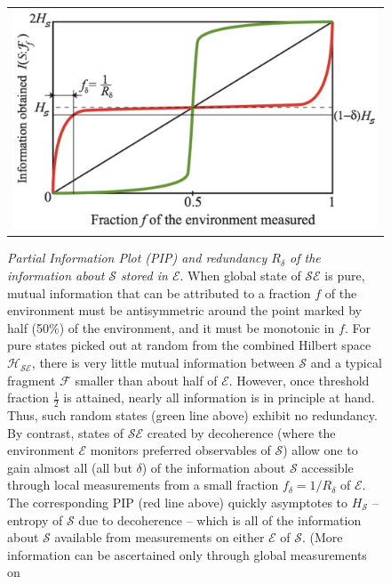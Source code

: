 \documentclass[aps,twocolumn,rmp,epsfig]{revtex4}
\def\FCW{0.98\columnwidth}
\newcommand{\cH}        {{\mathcal H}}
\newcommand{\cS}        {{\mathcal S}}
\newcommand{\cE}        {{\mathcal E}}
\newcommand{\+}         {\dagger}
\newcommand\cF{{\mathcal F}}
\begin{document}
\begin{figure}[tb]
\begin{tabular}{l}
\vspace{-0.15in} \includegraphics[width=\FCW]{pips1B.pdf}\\
\end{tabular}
\caption{\emph{Partial Information Plot (PIP) and redundancy $R_\delta$ of the information 
about $\cS$ stored in $\cE$}.  When global state of $\cS\cE$ is pure, mutual information that can be 
attributed to a fraction $f$ of the environment must be antisymmetric around the point marked by half 
(50\%) of the environment, and it must be monotonic in $f$. For pure states picked out at random from 
the combined Hilbert space $\cH_{\cS\cE}$, there is very little mutual information between $\cS$ and 
a typical fragment $\cF$ smaller than about half of $\cE$. However, once threshold fraction $\frac 1 2$ 
is attained, nearly all information is in principle at hand. Thus, such random states (green line above)
exhibit no redundancy. By contrast, states of $\cS\cE$ created by decoherence (where the environment $\cE$ monitors preferred observables of $\cS$) allow one to gain almost all (all but $\delta$) of the information about $\cS$ accessible through local measurements from a small fraction $f_\delta=1/R_\delta$ of $\cE$. The corresponding PIP (red line above) quickly asymptotes to $H_\cS$ -- entropy 
of $\cS$ due to decoherence -- which is all of the information about $\cS$ available from measurements
on either $\cE$ of $\cS$. (More information can be ascertained only through global measurements on 
}
\end{figure}
\end{document}
